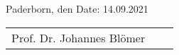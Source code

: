 \vspace*{.5cm}
\ifgerman
Paderborn, den
\else
Date: 14.09.2021
\fi
\vspace*{1cm}
\begin{center}
	\begin{tabular}{l p{} r}
	  \cline{1-1} \cline{3-3}
	  \begin{minipage}[t]{0.4\textwidth}
	    \centering
	    Prof. Dr. Johannes Blömer
		\end{minipage}
		&
		\begin{minipage}[t]{0.2\textwidth}
		\end{minipage}
		&
		\begin{minipage}[t]{0.4\textwidth}
		  \centering
		  \Author
		\end{minipage}
	\end{tabular}
\end{center}
